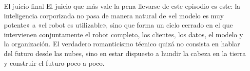 \documentclass[a4paper]{article}
\begin{document}
\begin{importantbox}{El juicio final}
El juicio que más vale la pena llevarse de este episodio es este: la inteligencia corporizada no pasa de manera natural de «el modelo es muy potente» a «el robot es utilizable», sino que forma un ciclo cerrado en el que intervienen conjuntamente el robot completo, los clientes, los datos, el modelo y la organización. El verdadero romanticismo técnico quizá no consista en hablar del futuro desde las nubes, sino en estar dispuesto a hundir la cabeza en la tierra y construir el futuro poco a poco.
\end{importantbox}
\end{document}
